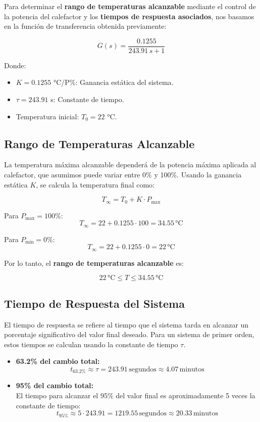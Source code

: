 \documentclass[spanish, a4paper, 11pt]{article}
\begin{document}
Para determinar el \textbf{rango de temperaturas alcanzable} mediante el control de la potencia del calefactor y los \textbf{tiempos de respuesta asociados}, nos basamos en la función de transferencia obtenida previamente:

\[
G(s) = \frac{0.1255}{243.91 \, s + 1}
\]

Donde:
\begin{itemize}
    \item $K = 0.1255$ °C/P\%: Ganancia estática del sistema.
    \item $\tau = 243.91$ s: Constante de tiempo.
    \item Temperatura inicial: $T_0 = 22$ °C.
\end{itemize}

\subsection{Rango de Temperaturas Alcanzable}

La temperatura máxima alcanzable dependerá de la potencia máxima aplicada al calefactor, que asumimos puede variar entre 0\% y 100\%. Usando la ganancia estática $K$, se calcula la temperatura final como:

\[
T_{\infty} = T_0 + K \cdot P_{\text{max}}
\]

Para $P_{\text{max}} = 100\%$:
\[
T_{\infty} = 22 + 0.1255 \cdot 100 = 34.55 \, \text{°C}
\]

Para $P_{\text{min}} = 0\%$:
\[
T_{\infty} = 22 + 0.1255 \cdot 0 = 22 \, \text{°C}
\]

Por lo tanto, el \textbf{rango de temperaturas alcanzable} es:

\[
22 \, \text{°C} \leq T \leq 34.55 \, \text{°C}
\]

\subsection{Tiempo de Respuesta del Sistema}

El tiempo de respuesta se refiere al tiempo que el sistema tarda en alcanzar un porcentaje significativo del valor final deseado. Para un sistema de primer orden, estos tiempos se calculan usando la constante de tiempo $\tau$.

\begin{itemize}
    \item \textbf{63.2\% del cambio total:}
    \[
    t_{63.2\%} \approx \tau = 243.91 \, \text{segundos} \approx 4.07 \, \text{minutos}
    \]

    \item \textbf{95\% del cambio total:} \\
    El tiempo para alcanzar el 95\% del valor final es aproximadamente 5 veces la constante de tiempo:
    \[
    t_{95\%} \approx 5 \cdot 243.91 = 1219.55 \, \text{segundos} \approx 20.33 \, \text{minutos}
    \]
\end{itemize}
\end{document}
